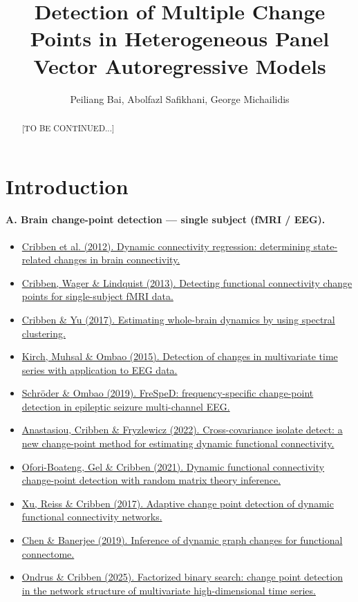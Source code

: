 \documentclass[11pt]{article}
\title{\bf Detection of Multiple Change Points in Heterogeneous Panel Vector Autoregressive Models}
\author{Peiliang Bai, Abolfazl Safikhani, George Michailidis}
\begin{document}
\maketitle
\begin{abstract}
    [TO BE CONTINUED...]
\end{abstract}

\section{Introduction}

\paragraph{A. Brain change-point detection --- single subject (fMRI / EEG).}
\begin{itemize}
    \item \href{https://doi.org/10.1016/j.neuroimage.2012.03.070}{Cribben et al. (2012). Dynamic connectivity regression: determining state-related changes in brain connectivity.} \cite{cribben2012dynamic}
    \item \href{https://doi.org/10.3389/fncom.2013.00143}{Cribben, Wager \& Lindquist (2013). Detecting functional connectivity change points for single-subject fMRI data.} \cite{cribben2013detecting}
    \item \href{https://doi.org/10.1111/rssc.12169}{Cribben \& Yu (2017). Estimating whole-brain dynamics by using spectral clustering.} \cite{cribben2017estimating}
    \item \href{https://doi.org/10.1080/01621459.2014.957545}{Kirch, Muhsal \& Ombao (2015). Detection of changes in multivariate time series with application to EEG data.} \cite{kirch2015detection}
    \item \href{https://doi.org/10.1080/01621459.2018.1476238}{Schr\"oder \& Ombao (2019). FreSpeD: frequency-specific change-point detection in epileptic seizure multi-channel EEG.} \cite{schroder2019frespd}
    \item \href{https://doi.org/10.1016/j.media.2021.102252}{Anastasiou, Cribben \& Fryzlewicz (2022). Cross-covariance isolate detect: a new change-point method for estimating dynamic functional connectivity.} \cite{anastasiou2022ccid}
    \item \href{https://doi.org/10.3389/fnins.2021.565029}{Ofori-Boateng, Gel \& Cribben (2021). Dynamic functional connectivity change-point detection with random matrix theory inference.} \cite{ofori2021dynamic}
    \item \href{https://doi.org/10.1016/j.neuroimage.2017.02.061}{Xu, Reiss \& Cribben (2017). Adaptive change point detection of dynamic functional connectivity networks.} \cite{xu2018adaptive}
    \item \href{https://arxiv.org/abs/1905.09993}{Chen \& Banerjee (2019). Inference of dynamic graph changes for functional connectome.} \cite{chen2019inference}
    \item \href{https://doi.org/10.1162/imag_a_00520}{Ondrus \& Cribben (2025). Factorized binary search: change point detection in the network structure of multivariate high-dimensional time series.} \cite{ondrus2025fabisearch}
\end{itemize}
\end{document}
